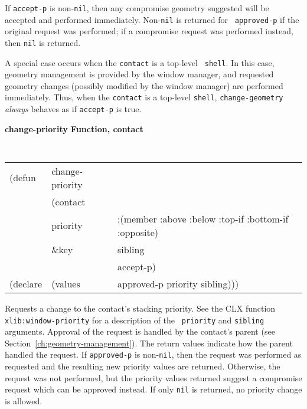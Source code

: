 \documentclass[twoside]{book}
\begin{document}
\begin{sloppy}
\begin{flushright}\parbox[t]{6.125in}{
If {\tt accept-p} is non-{\tt nil}, then any compromise geometry suggested will be
accepted and performed immediately. Non-{\tt nil} is returned for {\tt
approved-p} if the original request was performed; if a compromise request was
performed instead, then {\tt nil} is returned.
}\end{flushright}

\begin{flushright}\parbox[t]{6.125in}{ 
A special case occurs when the {\tt contact} is a top-level {\tt
shell}. In this case, geometry management
is provided by the window manager, and requested geometry
changes (possibly modified by the window manager) are performed immediately.
Thus, when the {\tt contact} is a top-level {\tt shell}, {\tt change-geometry}
{\em always} behaves as if {\tt accept-p} is true.
}\end{flushright}



{\samepage
{\large {\bf change-priority \hfill Function, contact}}
\begin{flushright}
\parbox[t]{6.125in}{
\tt
\begin{tabular}{lll}
\raggedright
(defun & change-priority & \\
& (contact\\
&  priority & ;(member :above :below :top-if :bottom-if :opposite)\\
& \&key & sibling\\
& & accept-p) \\
(declare &(values &approved-p priority sibling)))
\end{tabular}
\rm}
\end{flushright}}

\begin{flushright}\parbox[t]{6.125in}{
Requests a change to the contact's stacking priority.
See the CLX function {\tt xlib:window-priority} for a description of the {\tt
priority} and {\tt sibling} arguments.
Approval of the request is handled by the contact's parent (see
Section~\ref{ch:geometry-management}).
The return values indicate how the parent handled the 
request. If {\tt approved-p} is non-{\tt nil}, then the request was performed as
requested and
the resulting new priority values are returned. Otherwise, the request was not
performed, but the priority
values returned suggest a compromise request which can be approved instead.
If only {\tt nil} is returned, no priority change is allowed.
}\end{flushright}


\end{sloppy}
\end{document}

